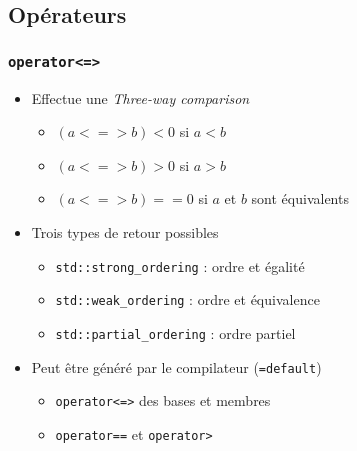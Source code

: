 \documentclass[C++.tex]{subfiles}
\begin{document}
\subsection*{Opérateurs}
\begin{frame}[fragile]
	\frametitle{\lstinline|operator<=>|}
	\begin{itemize}
		\item Effectue une \og \textit{Three-way comparison}\fg{}
		\begin{itemize}
			\item $(a <=> b) < 0$ si $a < b$
			\item $(a <=> b) > 0$ si $a > b$
			\item $(a <=> b) == 0$ si $a$ et $b$ sont équivalents


		\end{itemize}
		\item Trois types de retour possibles
		\begin{itemize}
			\item \lstinline|std::strong_ordering| : ordre et égalité
			\item \lstinline|std::weak_ordering| : ordre et équivalence
			\item \lstinline|std::partial_ordering| : ordre partiel
		\end{itemize}


		\item Peut être généré par le compilateur (\lstinline|=default|)
		\begin{itemize}
			\item \lstinline|operator<=>| des bases et membres
			\item \lstinline|operator==| et \lstinline|operator>|
		\end{itemize}
	\end{itemize}
\end{frame}
\end{document}
